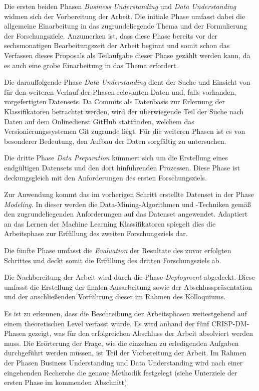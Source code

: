 Die ersten beiden Phasen \emph{Business Understanding} und \emph{Data Understanding} widmen sich der Vorbereitung der Arbeit. Die initiale Phase umfasst dabei die allgemeine Einarbeitung in das zugrundeliegende Thema und der Formulierung der Forschungsziele. Anzumerken ist, dass diese Phase bereits vor der sechsmonatigen Bearbeitungszeit der Arbeit beginnt und somit schon das Verfassen dieses Proposals als Teilaufgabe dieser Phase gezählt werden kann, da es auch eine grobe Einarbeitung in das Thema erfordert.

Die darauffolgende Phase \emph{Data Understanding} dient der Suche und Einsicht von für den weiteren Verlauf der Phasen relevanten Daten und, falls vorhanden, vorgefertigten Datensets. Da Commits als Datenbasis zur Erlernung der Klassifikatoren betrachtet werden, wird der überwiegende Teil der Suche nach Daten auf dem Onlinedienst GitHub stattfinden, welchem das Versionierungssystemen Git zugrunde liegt. Für die weiteren Phasen ist es von besonderer Bedeutung, den Aufbau der Daten sorgfältig zu untersuchen.

Die dritte Phase \emph{Data Preparation} kümmert sich um die Erstellung eines endgültigen Datensets und den dort hinführenden Prozessen. Diese Phase ist deckungsgleich mit den Anforderungen des ersten Forschungsziels.

Zur Anwendung kommt das im vorherigen Schritt erstellte Datenset in der Phase \emph{Modeling}. In dieser werden die Data-Mining-Algorithmen und -Techniken gemäß den zugrundeliegenden Anforderungen auf das Datenset angewendet. Adaptiert an das Lernen der Machine Learning Klassifikatoren spiegelt dies die Arbeitsphase zur Erfüllung des zweiten Forschungsziels dar. 

Die fünfte Phase umfasst die \emph{Evaluation} der Resultate des zuvor erfolgten Schrittes und deckt somit die Erfüllung des dritten Forschungsziels ab.

Die Nachbereitung der Arbeit wird durch die Phase \emph{Deployment} abgedeckt. Diese umfasst die Erstellung der finalen Ausarbeitung sowie der Abschlusspräsentation und der anschließenden Vorführung dieser im Rahmen des Kolloquiums.

Es ist zu erkennen, dass die Beschreibung der Arbeitsphasen weitestgehend auf einem theoretischen Level verfasst wurde. Es wird anhand der fünf CRISP-DM-Phasen gezeigt, was für den erfolgreichen Abschluss der Arbeit absolviert werden muss. Die Erörterung der Frage, wie die einzelnen zu erledigenden Aufgaben durchgeführt werden müssen, ist Teil der Vorbereitung der Arbeit. Im Rahmen der Phasen Business Understanding und Data Understanding wird nach einer eingehenden Recherche die genaue Methodik festgelegt (siehe Unterziele der ersten Phase im kommenden Abschnitt).  

